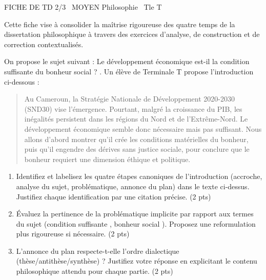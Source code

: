 \documentclass[11pt]{article}
\begin{document}
\begin{tcolorbox}[enhanced,colback=popink,colframe=popink,arc=10pt,boxrule=0pt,left=12pt,right=12pt,top=9pt,bottom=9pt]
{\color{white}\popxbold\small FICHE DE TD 2/3 \textbullet\ MOYEN \hfill Philosophie \textbullet\ Tle T\par}
\end{tcolorbox}
\vspace{4pt}
\noindent Cette fiche vise à consolider la maîtrise rigoureuse des quatre temps de la dissertation philosophique à travers des exercices d'analyse, de construction et de correction contextualisés.

\begin{exercice}
On propose le sujet suivant : \og Le développement économique est-il la condition suffisante du bonheur social ? \fg{}. Un élève de Terminale T propose l'introduction ci-dessous :
\begin{quote}
\og Au Cameroun, la Stratégie Nationale de Développement 2020-2030 (SND30) vise l'émergence. Pourtant, malgré la croissance du PIB, les inégalités persistent dans les régions du Nord et de l'Extrême-Nord. Le développement économique semble donc nécessaire mais pas suffisant. Nous allons d'abord montrer qu'il crée les conditions matérielles du bonheur, puis qu'il engendre des dérives sans justice sociale, pour conclure que le bonheur requiert une dimension éthique et politique. \fg{}
\end{quote}
\begin{enumerate}
    \item Identifiez et labelisez les quatre étapes canoniques de l'introduction (accroche, analyse du sujet, problématique, annonce du plan) dans le texte ci-dessus. Justifiez chaque identification par une citation précise. (2 pts)
    \item Évaluez la pertinence de la problématique implicite par rapport aux termes du sujet (\og condition suffisante \fg{}, \og bonheur social \fg{}). Proposez une reformulation plus rigoureuse si nécessaire. (2 pts)
    \item L'annonce du plan respecte-t-elle l'ordre dialectique (thèse/antithèse/synthèse) ? Justifiez votre réponse en explicitant le contenu philosophique attendu pour chaque partie. (2 pts)
\end{enumerate}
\end{exercice}
\end{document}
